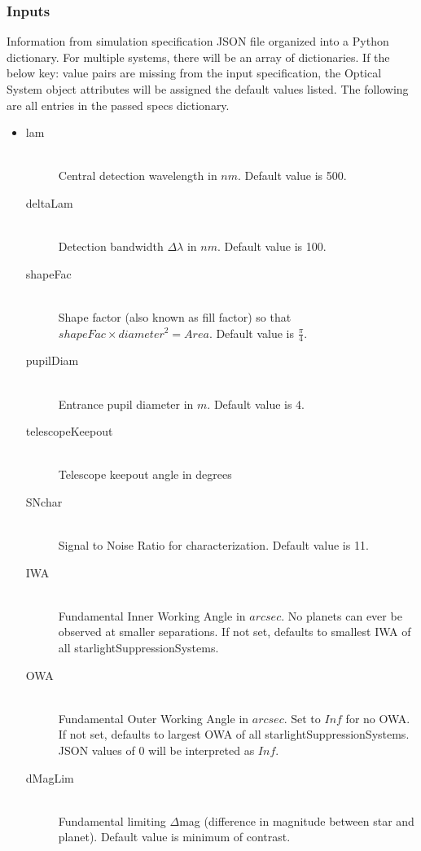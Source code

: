 \documentclass[cleanfoot]{asme2ej}
\begin{document}
\subsubsection*{Inputs}
Information from simulation specification JSON file organized into a Python dictionary.  For multiple systems, there will be an array of dictionaries. If the below key: value pairs are missing from the input specification, the Optical System object attributes will be assigned the default values listed. The following are all entries in the passed specs dictionary.

\begin{itemize}
    \item 
\begin{description}
    \item[lam] \hfill \\
    Central detection wavelength in $ nm $. Default value is 500.
    \item[deltaLam] \hfill \\
    Detection bandwidth $ \Delta\lambda $ in $ nm $. Default value is 100.
    \item[shapeFac] \hfill \\
    Shape factor (also known as fill factor) so that $ shapeFac \times diameter^2 = Area $. Default value is $ \frac{\pi}{4} $.
    \item[pupilDiam] \hfill \\
    Entrance pupil diameter in  $ m $. Default value is $ 4$.
    \item[telescopeKeepout] \hfill \\
        Telescope keepout angle in degrees
    \item[SNchar] \hfill \\
    Signal to Noise Ratio for characterization. Default value is 11.
    \item[IWA] \hfill \\
    Fundamental Inner Working Angle in $ arcsec $. No planets can ever be observed at smaller separations. If not set, defaults to smallest IWA of all starlightSuppressionSystems.
    \item[OWA] \hfill \\
    Fundamental Outer Working Angle in $ arcsec $. Set to $ Inf $ for no OWA. If not set, defaults to largest OWA of all starlightSuppressionSystems.  JSON values of 0 will be interpreted as $ Inf $.
    \item[dMagLim] \hfill \\
    Fundamental limiting $ \Delta$mag (difference in magnitude between star and planet). Default value is minimum of contrast.

\end{description}
\end{itemize}
\end{document}

